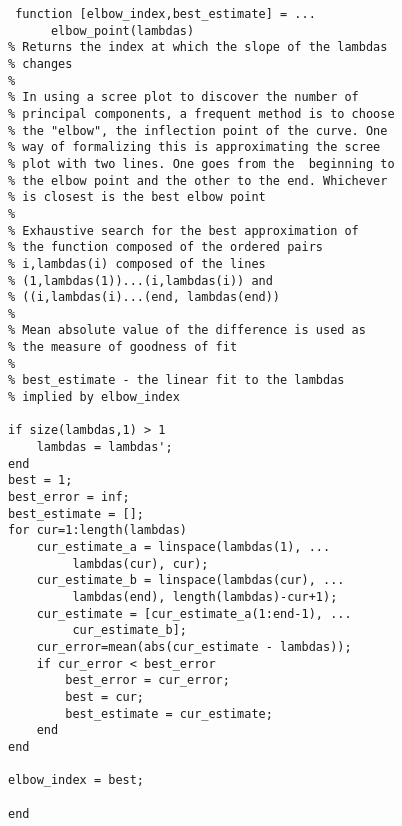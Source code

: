 \documentclass[eric_thesis.tex]{subfiles}
\begin{document}
\begin{lstlisting}
 function [elbow_index,best_estimate] = ...
      elbow_point(lambdas)
% Returns the index at which the slope of the lambdas
% changes
%
% In using a scree plot to discover the number of 
% principal components, a frequent method is to choose
% the "elbow", the inflection point of the curve. One
% way of formalizing this is approximating the scree 
% plot with two lines. One goes from the  beginning to
% the elbow point and the other to the end. Whichever
% is closest is the best elbow point 
%
% Exhaustive search for the best approximation of
% the function composed of the ordered pairs
% i,lambdas(i) composed of the lines
% (1,lambdas(1))...(i,lambdas(i)) and
% ((i,lambdas(i)...(end, lambdas(end))
%
% Mean absolute value of the difference is used as
% the measure of goodness of fit
%
% best_estimate - the linear fit to the lambdas
% implied by elbow_index

if size(lambdas,1) > 1
    lambdas = lambdas';
end
best = 1;
best_error = inf;
best_estimate = [];
for cur=1:length(lambdas)
    cur_estimate_a = linspace(lambdas(1), ...
         lambdas(cur), cur);
    cur_estimate_b = linspace(lambdas(cur), ...
         lambdas(end), length(lambdas)-cur+1);
    cur_estimate = [cur_estimate_a(1:end-1), ...
         cur_estimate_b];
    cur_error=mean(abs(cur_estimate - lambdas));
    if cur_error < best_error
        best_error = cur_error;
        best = cur;
        best_estimate = cur_estimate;
    end
end

elbow_index = best;

end
\end{lstlisting}
\end{document}
